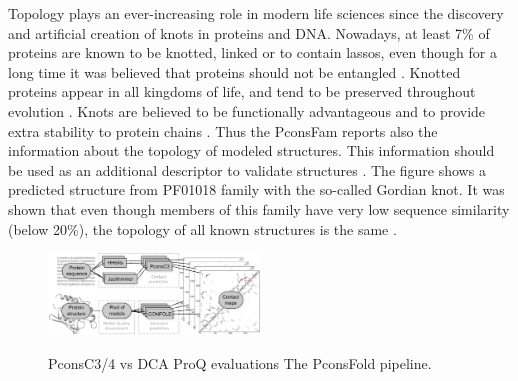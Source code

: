 \documentclass[a4,center,fleqn]{NAR}
\begin{document}
Topology plays an ever-increasing role in modern life sciences since
the discovery and artificial creation of knots in proteins and DNA.
Nowadays, at least 7\% of proteins are known to be knotted, linked or
to contain lassos, even though for a long time it was believed that
proteins should not be entangled \cite{sulkowska2018entangled}. Knotted proteins appear in all
kingdoms of life, and tend to be preserved throughout evolution \cite{sulkowska2012conservation}. 
Knots are believed to be functionally advantageous and to provide extra
stability to protein chains \cite{christian2016methyl}.
Thus the PconsFam reports also the information about the topology of
modeled structures. This information should be used as an additional
descriptor to validate structures \cite{khatib2006rapid}. The figure shows a
predicted structure from PF01018 family with the so-called Gordian
knot. It was shown that even though members of this family have very
low sequence similarity (below 20\%), the topology of all known
structures is the same \cite{sulkowska2012conservation}.



\begin{figure}[t]
\begin{center}
\end{center}
\caption{PconsC3/4 vs DCA
ProQ evaluations 
The PconsFold pipeline.}
    \includegraphics[width=0.5\textwidth]{figures/flowchart.eps}
\label{fig:Pipeline}
\end{figure}
\end{document}
